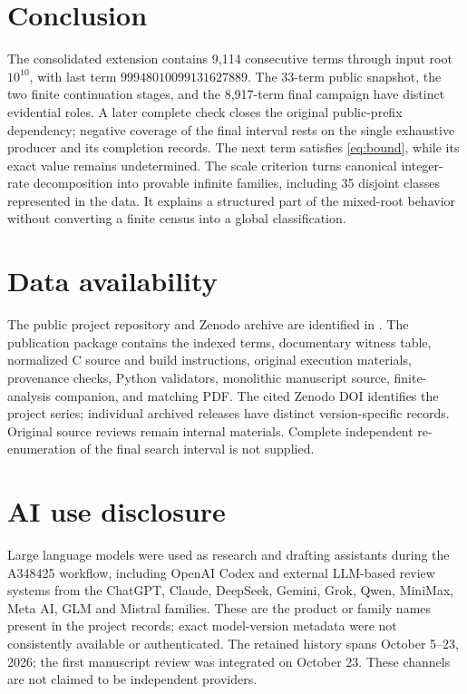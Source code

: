 \documentclass[11pt]{article}
\theoremstyle{definition}
\theoremstyle{remark}
\begin{document}
\section{Conclusion}
The consolidated extension contains 9,114 consecutive terms through
input root $10^{10}$, with last term $99948010099131627889$.
The 33-term public snapshot, the two finite continuation stages,
and the 8,917-term final campaign have distinct evidential roles.
A later complete check closes the original public-prefix dependency;
negative coverage of the final interval rests on the single exhaustive
producer and its completion records.
The next term satisfies \eqref{eq:bound}, while its exact value remains
undetermined. The scale criterion turns canonical integer-rate
decomposition into provable infinite families, including 35 disjoint
classes represented in the data. It explains a structured part of the
mixed-root behavior without converting a finite census into a global
classification.

\section*{Data availability}
The public project repository and Zenodo archive are identified in
\cite{project}. The publication package contains the indexed terms,
documentary witness table, normalized C source and build instructions,
original execution materials, provenance checks, Python validators,
monolithic manuscript source, finite-analysis companion, and matching PDF.
The cited Zenodo DOI identifies the project series; individual archived
releases have distinct version-specific records. Original source reviews
remain internal materials. Complete independent re-enumeration of the
final search interval is not supplied.

\section*{AI use disclosure}
Large language models were used as research and drafting assistants during
the A348425 workflow, including OpenAI Codex and external LLM-based
review systems from the ChatGPT, Claude, DeepSeek, Gemini, Grok, Qwen,
MiniMax, Meta AI, GLM and Mistral families. These are the product or family
names present in the project records; exact model-version metadata were
not consistently available or authenticated. The retained history spans
October 5--23, 2026; the first manuscript review was integrated on
October 23. These channels are not claimed to be independent providers.
\end{document}
